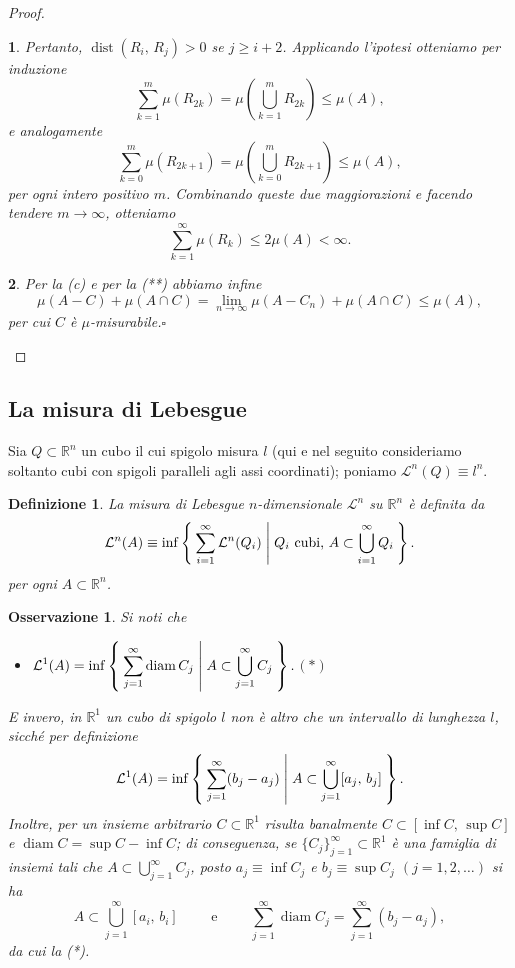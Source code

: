 \documentclass[a4paper,10pt,openright,oneside]{book}
\theoremstyle{theoremstyle}
\theoremstyle{theoremstylewoheader}
\theoremstyle{theoremstyle}
\newtheorem{definizione}[teorema]{Definizione}
\newtheorem{osservazione}[teorema]{Osservazione}
\theoremstyle{proofsecstyle}
\newtheorem{proofsec}{}
\theoremstyle{nonumberplain}
\newtheorem{proof}{Dim.}
\newcommand{\RR}{\ensuremath{\mathbb{R}}}
\newcommand{\Leb}{\ensuremath{\mathcal{L}}}
\DeclareMathOperator{\diam}{diam}
\DeclareMathOperator{\dist}{dist}
\renewcommand{\qedsymbol}{\ensuremath{\square}}
\newcommand{\qed}{\unskip\nobreak\hfill\nobreak\hspace{.5em}\qedsymbol}
\newcommand{\mymath}[2]{\begin{itemize}%
  \item[]\hfill\hbox{}\ensuremath{\displaystyle #1}\hfill\ensuremath{\displaystyle #2}%
  \end{itemize}}
\begin{document}
\begin{proof}
\begin{proofsec}
Pertanto, $\dist(R_i,\, R_j) > 0$ se $j \ge i+2$. Applicando l'ipotesi otteniamo per induzione
\[
\sum_{k=1}^m \mu(R_{2k}) = \mu \left(\bigcup_{k=1}^m R_{2k}\right) \le \mu(A),
\]
e analogamente
\[
\sum_{k=0}^m \mu(R_{2k+1}) = \mu \left(\bigcup_{k=0}^m R_{2k+1}\right) \le \mu(A),
\]
per ogni intero positivo $m$. Combinando queste due maggiorazioni e facendo tendere $m \to \infty$, otteniamo
\[
\sum_{k=1}^\infty \mu(R_k) \le 2\mu(A) < \infty.
\]
\end{proofsec}

\begin{proofsec}
Per la (c) e per la (**) abbiamo infine
\[
\mu(A - C) + \mu(A \cap C) = \lim_{n \to \infty} \mu(A - C_n) + \mu(A \cap C) \le \mu(A),
\]
per cui $C$ è $\mu$-misurabile.\qed
\end{proofsec}
\end{proof}

\subsection{La misura di Lebesgue}

Sia $Q \subset \RR^n$ un cubo il cui spigolo misura $l$ (qui e nel seguito consideriamo soltanto cubi con spigoli paralleli agli assi coordinati); poniamo $\Leb^n(Q) \equiv l^n$.

\begin{definizione}
\label{def:misura_lebesgue}
La \emph{misura di Lebesgue $n$-dimensionale} $\Leb^n$ su $\RR^n$ è definita da
\[
\Leb^n(A) \equiv \inf\Set{ \sum_{i=1}^\infty \Leb^n(Q_i) | Q_i \text{ cubi, } A \subset \bigcup_{i=1}^\infty Q_i }.
\]
per ogni $A \subset \RR^n$.
\end{definizione}

\begin{osservazione}
\label{oss:caratterizzazione_misura_lebesgue_lineare}
Si noti che \mymath{\Leb^1(A) = \inf\Set{ \sum_{j=1}^\infty \diam C_j | A \subset \bigcup_{j=1}^\infty C_j }.}{(*)} E invero, in $\RR^1$ un cubo di spigolo $l$ non è altro che un intervallo di lunghezza $l$, sicché per definizione
\[
\Leb^1(A) = \inf\Set{ \sum_{j=1}^\infty (b_j - a_j) | A \subset \bigcup_{j=1}^\infty [a_j,\, b_j] }.
\]
Inoltre, per un insieme arbitrario $C \subset \RR^1$ risulta banalmente $C \subset [\inf C,\, \sup C]$ e $\diam C = \sup C - \inf C$; di conseguenza, se $\{C_j\}_{j=1}^\infty \subset \RR^1$ è una famiglia di insiemi tali che $A \subset \bigcup_{j=1}^\infty C_j$, posto $a_j \equiv \inf C_j$ e $b_j \equiv \sup C_j$ $(j = 1, 2, \ldots)$ si ha
\[
A \subset \bigcup_{j=1}^\infty [a_i,\, b_i] \qquad\text{ e }\qquad \sum_{j=1}^\infty \diam C_j = \sum_{j=1}^\infty (b_j - a_j),
\]
da cui la (*).
\end{osservazione}
\end{document}
